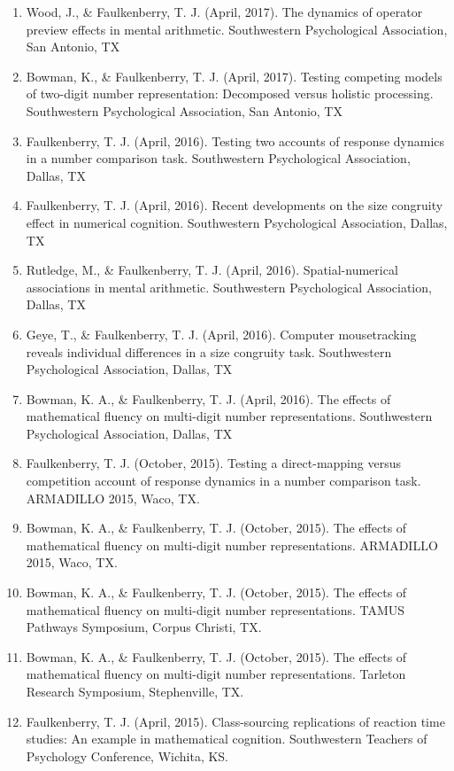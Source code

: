 \documentclass[article,10pt]{article}
\begin{document}
\begin{enumerate}
\item Wood, J., \& Faulkenberry, T. J. (April, 2017). The dynamics of operator preview effects in mental arithmetic. Southwestern Psychological Association, San Antonio, TX
\item Bowman, K., \& Faulkenberry, T. J. (April, 2017). Testing competing models of two-digit number representation: Decomposed versus holistic processing. Southwestern Psychological Association, San Antonio, TX
\item Faulkenberry, T. J. (April, 2016). Testing two accounts of response dynamics in a number comparison task. Southwestern Psychological Association, Dallas, TX
\item Faulkenberry, T. J. (April, 2016). Recent developments on the size congruity effect in numerical cognition. Southwestern Psychological Association, Dallas, TX
\item Rutledge, M., \& Faulkenberry, T. J. (April, 2016). Spatial-numerical associations in mental arithmetic. Southwestern Psychological Association, Dallas, TX
\item Geye, T., \& Faulkenberry, T. J. (April, 2016). Computer mousetracking reveals individual differences in a size congruity task. Southwestern Psychological Association, Dallas, TX
\item Bowman, K. A., \& Faulkenberry, T. J. (April, 2016). The effects of mathematical fluency on multi-digit number representations. Southwestern Psychological Association, Dallas, TX
\item Faulkenberry, T. J. (October, 2015). Testing a direct-mapping versus competition account of response dynamics in a number comparison task. ARMADILLO 2015, Waco, TX.
\item Bowman, K. A., \& Faulkenberry, T. J. (October, 2015). The effects of mathematical fluency on multi-digit number representations. ARMADILLO 2015, Waco, TX.
\item Bowman, K. A., \& Faulkenberry, T. J. (October, 2015). The effects of mathematical fluency on multi-digit number representations. TAMUS Pathways Symposium, Corpus Christi, TX.
\item Bowman, K. A., \& Faulkenberry, T. J. (October, 2015). The effects of mathematical fluency on multi-digit number representations. Tarleton Research Symposium, Stephenville, TX.
\item Faulkenberry, T. J. (April, 2015). Class-sourcing replications of reaction time studies: An example in mathematical cognition. Southwestern Teachers of Psychology Conference, Wichita, KS.

\end{enumerate}
\end{document}

